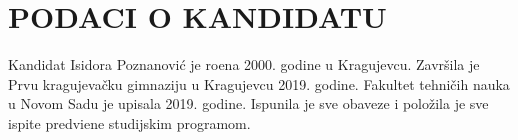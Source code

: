 \section*{PODACI O KANDIDATU}
Kandidat Isidora Poznanovi\' c je ro\dj ena 2000. godine u Kragujevcu. Završila je Prvu kragujeva\v cku gimnaziju u Kragujevcu 2019. godine. Fakultet tehničih nauka u Novom Sadu je upisala 2019. godine. Ispunila je sve obaveze i položila je sve ispite predvi\dj ene studijskim programom.
